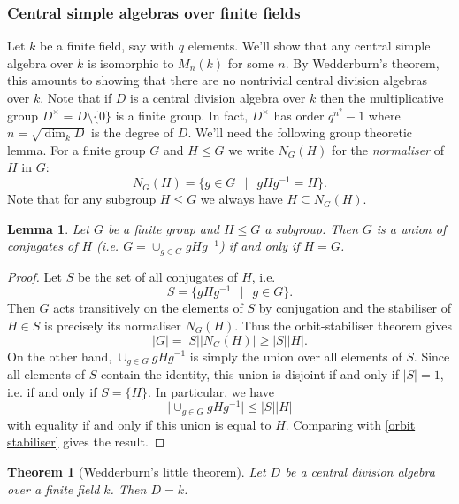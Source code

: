\documentclass[11pt]{amsart}
\numberwithin{equation}{section}
\newtheorem{theorem}[equation]{Theorem}
\newtheorem{lemma}[equation]{Lemma}
\theoremstyle{remark}
\theoremstyle{remark}
\theoremstyle{remark}
\theoremstyle{definition}
\theoremstyle{definition}
\theoremstyle{definition}
\theoremstyle{definition}
\theoremstyle{definition}
\theoremstyle{definition}
\begin{document}
\subsubsection{Central simple algebras over finite fields}

Let $k$ be a finite field, say with $q$ elements. We'll show that any central simple algebra over $k$ is isomorphic to $M_n(k)$ for some $n$. By Wedderburn's theorem, this amounts to showing that there are no nontrivial central division algebras over $k$. Note that if $D$ is a central division algebra over $k$ then the multiplicative group $D^{\times}=D\setminus \{0\}$ is a finite group. In fact, $D^\times$ has order $q^{n^2}-1$ where $n=\sqrt{\dim_kD}$ is the degree of $D$. We'll need the following group theoretic lemma. For a finite group $G$ and $H\leq G$ we write $N_G(H)$  for the \textit{normaliser} of $H$ in $G$:
\[N_G(H)=\{g\in G~~\mid~~gHg^{-1}=H\}.\]
Note that for any subgroup $H\leq G$ we always have $H\subseteq N_G(H)$.

\begin{lemma} \label{subgroup conjugates}
Let $G$ be a finite group and $H\leq G$ a subgroup. Then $G$ is a union of conjugates of $H$ (i.e.
$G=\cup_{g\in G}gHg^{-1}$) if and only if $H=G$.
\end{lemma}

\begin{proof}
Let $S$ be the set of all conjugates of $H$, i.e.
\[S=\{gHg^{-1}~~\mid~~g\in G\}.\]
Then $G$ acts transitively on the elements of $S$ by conjugation and the stabiliser of $H\in S$ is precisely its normaliser $N_G(H)$. Thus the orbit-stabiliser theorem gives
\begin{equation} \label{orbit stabiliser}
|G|=|S||N_G(H)|\geq |S||H|.
\end{equation} 
On the other hand,  $\cup_{g\in G}gHg^{-1}$ is simply the union over all elements of $S$. Since all elements of $S$ contain the identity, this union is disjoint if and only if $|S|=1$, i.e. if and only if $S=\{H\}$. In particular, we have
\[\mid \cup_{g\in G}gHg^{-1}\mid \leq |S||H|\]
with equality if and only if this union is equal to $H$. Comparing with \cref{orbit stabiliser} gives the result.
\end{proof}

\begin{theorem}[Wedderburn's little theorem]
Let $D$ be a central division algebra over a finite field $k$. Then $D=k$.
\end{theorem}
\end{document}
